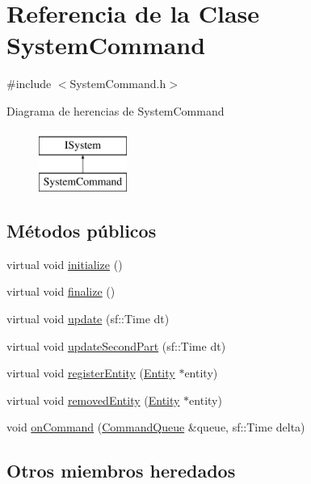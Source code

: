 \hypertarget{classSystemCommand}{}\section{Referencia de la Clase System\+Command}
\label{classSystemCommand}


{\ttfamily \#include $<$System\+Command.\+h$>$}

Diagrama de herencias de System\+Command\begin{figure}[H]
\begin{center}
\leavevmode
\includegraphics[height=2.000000cm]{classSystemCommand}
\end{center}
\end{figure}
\subsection*{Métodos públicos}
\begin{DoxyCompactItemize}
\item 
virtual void \hyperlink{classSystemCommand_a4e1ca3703de37a8c187618d17a4a676e}{initialize} ()
\item 
virtual void \hyperlink{classSystemCommand_ac9f9019b5d0facf91ed77815d6c577a7}{finalize} ()
\item 
virtual void \hyperlink{classSystemCommand_a111fbabb149f7f59a6084a459dd5f37d}{update} (sf\+::\+Time dt)
\item 
virtual void \hyperlink{classSystemCommand_a0ff2e49835ef779e59f04c56fcc87ee1}{update\+Second\+Part} (sf\+::\+Time dt)
\item 
virtual void \hyperlink{classSystemCommand_a6c00eed8d1b14f8f27bd5fb27ffcaffe}{register\+Entity} (\hyperlink{classEntity}{Entity} $\ast$entity)
\item 
virtual void \hyperlink{classSystemCommand_afde58b2c3b053a944dfa262da10eeea2}{removed\+Entity} (\hyperlink{classEntity}{Entity} $\ast$entity)
\item 
void \hyperlink{classSystemCommand_a58e0a261b3028155192f94b076cb0284}{on\+Command} (\hyperlink{classCommandQueue}{Command\+Queue} \&queue, sf\+::\+Time delta)
\end{DoxyCompactItemize}
\subsection*{Otros miembros heredados}


